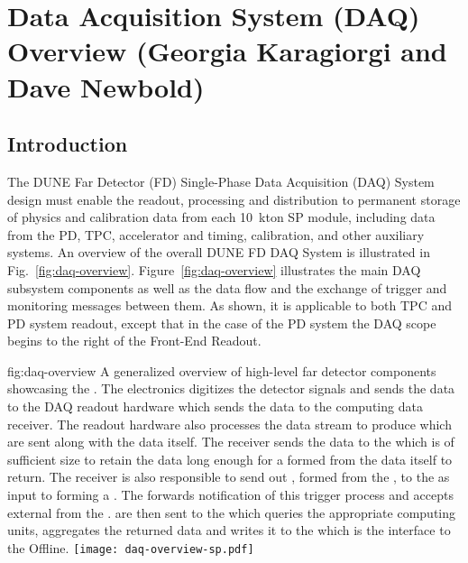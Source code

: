 \section{Data Acquisition System (DAQ) Overview (Georgia Karagiorgi and Dave Newbold)}
\label{sec:fdsp-daq-ov}


\subsection{Introduction}
\label{sec:fdsp-daq-intro}

The DUNE Far Detector (FD) Single-Phase Data Acquisition (DAQ) System
design must enable the readout, processing and distribution to
permanent storage of physics and calibration data from each 10~kton SP
module, including data from the PD, TPC, accelerator and timing,
calibration, and other auxiliary systems.
An overview of the overall DUNE FD DAQ System is illustrated in
Fig.~\ref{fig:daq-overview}. 
Figure~\ref{fig:daq-overview} illustrates the main DAQ subsystem
components as well as the data flow and the exchange of trigger and
monitoring messages between them.
As shown, it is applicable to both TPC and PD system readout, except
that in the case of the PD system the DAQ scope begins to the right of
the Front-End Readout. 

\begin{dunefigure}{fig:daq-overview}
  {A generalized overview of high-level far detector 
    components showcasing the  . 
    The electronics digitizes the detector signals and sends the data
    to the DAQ  readout hardware which sends the data to the
     computing data receiver.
    The  readout hardware also processes the data stream to
    produce  which are sent along with the data
    itself.
    The receiver sends the data to the  which is of
    sufficient size to retain the data long enough for a
     formed from the data itself to return.
    The receiver is also responsible to send out
    , formed from the , to
    the  as input to forming a . 
    The  forwards notification of this trigger process and
    accepts external  from the .
     are then sent to the  which queries
    the appropriate  computing units, aggregates the
    returned data and writes it to the  which is the
    interface to the Offline.}
\texttt{[image: daq-overview-sp.pdf]}%
\end{dunefigure}


